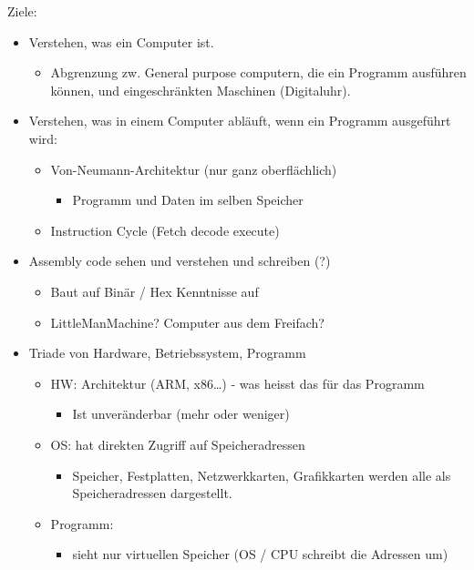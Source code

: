 {    Ziele:
    \begin{itemize}
		\item Verstehen, was ein Computer ist.
        \begin{itemize}
			\item Abgrenzung zw. General purpose computern, die ein Programm ausführen können, und eingeschränkten Maschinen (Digitaluhr).
        \end{itemize}
		\item Verstehen, was in einem Computer abläuft, wenn ein Programm ausgeführt wird:
        \begin{itemize}
			\item Von-Neumann-Architektur (nur ganz oberflächlich)
            \begin{itemize}
				\item Programm und Daten im selben Speicher
            \end{itemize}
			\item Instruction Cycle (Fetch decode execute)
        \end{itemize}
		\item Assembly code sehen und verstehen und schreiben (?)
        \begin{itemize}
			\item Baut auf Binär / Hex Kenntnisse auf
			\item LittleManMachine? Computer aus dem Freifach?
        \end{itemize}
		\item Triade von Hardware, Betriebssystem, Programm
        \begin{itemize}
			\item HW: Architektur (ARM, x86…) - was heisst das für das Programm
            \begin{itemize}
				\item Ist unveränderbar (mehr oder weniger)
            \end{itemize}
			\item OS: hat direkten Zugriff auf Speicheradressen
            \begin{itemize}
				\item Speicher, Festplatten, Netzwerkkarten, Grafikkarten werden alle als Speicheradressen dargestellt.
            \end{itemize}
			\item Programm:
            \begin{itemize}
				\item sieht nur virtuellen Speicher (OS / CPU schreibt die Adressen um)

\end{itemize}
\end{itemize}
\end{itemize}}

